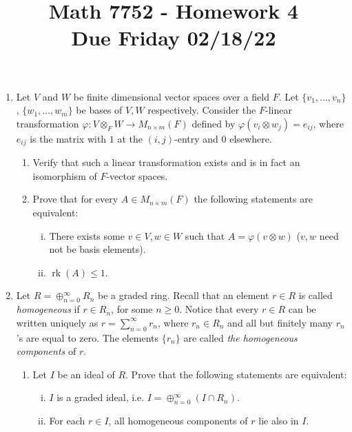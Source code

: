 \documentclass[12pt,
psamsfonts]{amsart}
\title{Math 7752 - Homework 4\\
Due Friday 02/18/22}
\theoremstyle{remark}
\theoremstyle{definition}
\DeclareMathOperator{\rk}{rk}
\numberwithin{equation}{section}
\begin{document}
\maketitle

\begin{enumerate}
 
\item Let $V$ and $W$ be finite dimensional vector spaces over a field $F$. Let $\{v_1,\ldots,v_n\}$, $\{w_1,\ldots,w_m\}$ be bases of $V,W$ respectively. Consider the $F$-linear transformation $\varphi:V\otimes_F W\rightarrow M_{n\times m}(F)$ defined by $\varphi(v_i\otimes w_j)=e_{ij}$, where $e_{ij}$ is the matrix with $1$ at the $(i,j)$-entry and $0$ elsewhere. 
\begin{enumerate}
\item Verify that such a linear transformation exists and is in fact an isomorphism of $F$-vector spaces.
\item Prove that for every $A\in M_{n\times m}(F)$ the following statements are equivalent:
\begin{enumerate}
[(i)]\item There exists some $v\in V, w\in W$ such that $A=\varphi(v\otimes w)$ ($v,w$ need not be basis elements).
\item $\rk(A)\leq 1$. 
\end{enumerate}
\end{enumerate} 
\medskip 
\item  Let $R=\oplus_{n=0}^\infty R_n$ be a graded ring. Recall that an element $r\in R$ is called \textit{homogeneous} if $r\in R_n$, for some $n\geq 0$. Notice that every $r\in R$ can be written uniquely as $\displaystyle r=\sum_{n=0}^\infty r_n$, where $r_n\in R_n$ and all but finitely many $r_n$'s are equal to zero. The elements $\{r_n\}$ are called \textit{the homogeneous components} of $r$. 
\begin{enumerate}
\item Let $I$ be an ideal of $R$. Prove that the following statements are equivalent:
\begin{enumerate}
[(i)]\item $I$ is a graded ideal, i.e. $\displaystyle I=\oplus_{n=0}^\infty(I\cap R_n)$.
\item For each $r\in I$, all homogeneous components of $r$ lie also in $I$.
\end{enumerate}

\end{enumerate}
\end{enumerate}
\end{document}
